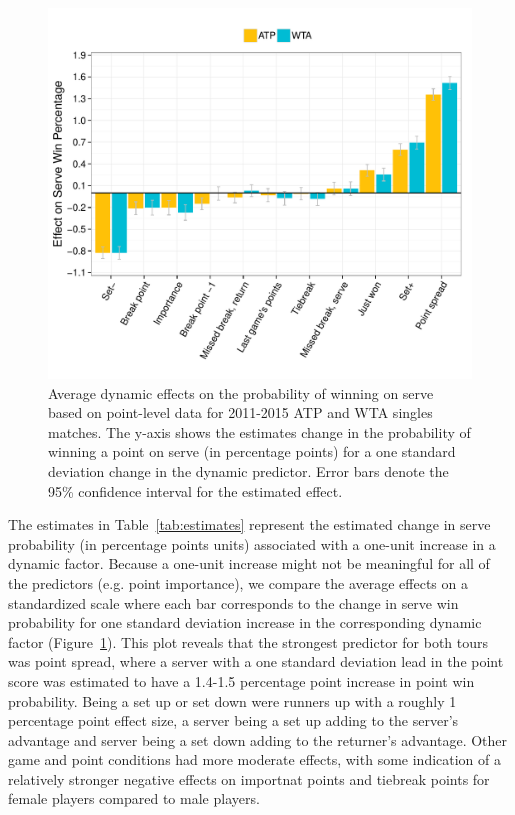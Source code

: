 \documentclass{Latex/svjour3}
\begin{document}
\begin{figure}
\includegraphics[scale=0.8]{figs/avg_effects.pdf}
\caption{Average dynamic effects on the probability of winning on serve based on
  point-level data for 2011-2015 ATP and WTA singles matches. The y-axis shows
  the estimates change in the probability of winning a point on serve (in
  percentage points) for a one standard deviation change in the dynamic
  predictor. Error bars denote the 95\% confidence interval for the estimated
  effect.}
\label{fig:1}
\end{figure}

The estimates in Table~\ref{tab:estimates} represent the estimated change in
serve probability (in percentage points units) associated with a one-unit
increase in a dynamic factor. Because a one-unit increase might not be
meaningful for all of the predictors (e.g. point importance), we compare the
average effects on a standardized scale where each bar corresponds to the change
in serve win probability for one standard deviation increase in the
corresponding dynamic factor (Figure~\ref{fig:1}). This plot reveals that the
strongest predictor for both tours was point spread, where a server with a one
standard deviation lead in the point score was estimated to have a 1.4-1.5
percentage point increase in point win probability. Being a set up or set down
were runners up with a roughly 1 percentage point effect size, a server being a
set up adding to the server's advantage and server being a set down adding to
the returner's advantage. Other game and point conditions had more moderate
effects, with some indication of a relatively stronger negative effects on
importnat points and tiebreak points for female players compared to male
players.
\end{document}
